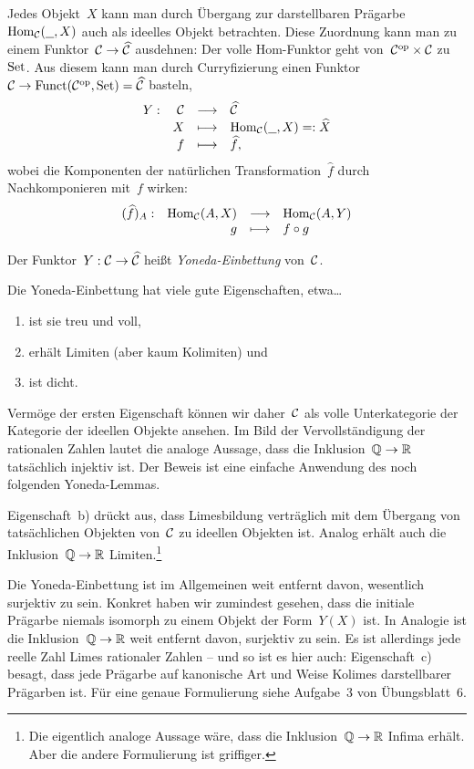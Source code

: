 Jedes Objekt~$X$ kann man durch Übergang zur darstellbaren
Prägarbe~$\mathrm{Hom}_{\mathcal{C}}(\underline{\ \ },X)$ auch als ideelles Objekt betrachten. Diese
Zuordnung kann man zu einem Funktor~$\mathcal{C} \to \widehat{\mathcal{C}}$ ausdehnen:
Der volle Hom-Funktor geht von~$\mathcal{C}^{\mathrm{op}} \times \mathcal{C}$ zu~$\mathrm{Set}$. Aus diesem kann
man durch Curryfizierung einen Funktor~$\mathcal{C} \to \mathrm{Funct}(\mathcal{C}^{\mathrm{op}},\mathrm{Set}) = \widehat{\mathcal{C}}$ basteln,
\[ \begin{array}{@{}rrcl@{}}
  Y : & \C &\longrightarrow& \widehat\C \\
  & X &\longmapsto& \Hom_\C(\freist,X) =: \widehat X \\
  & f &\longmapsto& \widehat f,
\end{array} \]
wobei die Komponenten der natürlichen Transformation~$\widehat f$ durch
Nachkomponieren mit~$f$ wirken:
\[ \begin{array}{@{}rrcl@{}}
  (\widehat f)_A : & \Hom_\C(A,X) &\longrightarrow& \Hom_\C(A,Y) \\
  & g &\longmapsto& f \circ g
\end{array} \]

\begin{defn}Der Funktor~$Y:\mathcal{C}\to\widehat{\mathcal{C}}$ heißt \emph{Yoneda-Einbettung}
von~$\mathcal{C}$.\end{defn}

Die Yoneda-Einbettung hat viele gute Eigenschaften, etwa\ldots
\begin{enumerate}
\item ist sie treu und voll,
\item erhält Limiten (aber kaum Kolimiten) und
\item ist dicht.
\end{enumerate}
Vermöge der ersten Eigenschaft können wir daher~$\mathcal{C}$ als volle Unterkategorie
der Kategorie der ideellen Objekte ansehen. Im Bild der Vervollständigung der
rationalen Zahlen lautet die analoge Aussage, dass die Inklusion~$\mathbb{Q} \to \mathbb{R}$
tatsächlich injektiv ist. Der Beweis ist eine einfache
Anwendung des noch folgenden Yoneda-Lemmas.

Eigenschaft~b) drückt aus, dass Limesbildung verträglich mit dem Übergang von
tat\-säch\-li\-chen Objekten von~$\mathcal{C}$ zu ideellen Objekten ist. Analog erhält auch die
Inklusion~$\mathbb{Q} \to \mathbb{R}$ Limiten.\footnote{Die eigentlich analoge Aussage wäre,
dass die Inklusion~$\mathbb{Q} \to \mathbb{R}$ Infima erhält. Aber die andere Formulierung
ist griffiger.}

Die Yoneda-Einbettung ist im Allgemeinen weit entfernt davon, wesentlich
surjektiv zu sein. Konkret haben wir zumindest gesehen, dass die initiale Prägarbe
niemals isomorph zu einem Objekt der Form~$Y(X)$ ist. In Analogie ist die
Inklusion~$\mathbb{Q} \to \mathbb{R}$ weit entfernt davon, surjektiv zu sein. Es ist
allerdings jede reelle Zahl Limes rationaler Zahlen -- und so ist es hier auch:
Eigenschaft~c) besagt, dass jede Prägarbe auf kanonische Art und Weise Kolimes
darstellbarer Prägarben ist. Für eine genaue Formulierung siehe Aufgabe~3 von
Übungsblatt~6.

